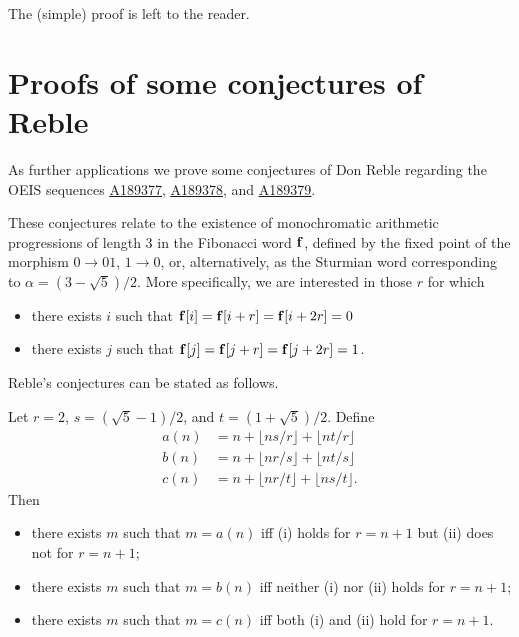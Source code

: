 \documentclass[12pt,reqno]{article}
\newcommand{\seqnum}[1]{\href{https://oeis.org/#1}{\rm \underline{#1}}}
\begin{document}
The (simple) proof  is left to the reader.

\section{Proofs of some conjectures of Reble}
\label{reble}

As further applications we prove some conjectures of Don Reble regarding
the OEIS sequences \seqnum{A189377}, 
\seqnum{A189378}, and \seqnum{A189379}.

These conjectures relate to the existence
of monochromatic arithmetic progressions
of length $3$ in the Fibonacci word $\bf f$, defined by
the fixed point of the morphism $0 \rightarrow 01$, $1 \rightarrow 0$, or, alternatively, as the Sturmian word
corresponding to $\alpha = (3-\sqrt{5})/2$.
More specifically, we are interested in those $r$ for which
\begin{itemize}
\item[(i)] there exists $i$ such that
${\bf f}[i] = {\bf f}[i+r] = {\bf f}[i+2r] = 0$
\item[(ii)] there exists $j$ such that
${\bf f}[j] = {\bf f}[j+r] = {\bf f}[j+2r] = 1$.
\end{itemize}

Reble's conjectures can be stated as follows.
\begin{theorem}
Let $r = 2$, $s = (\sqrt{5}-1)/2$, and $t = (1+\sqrt{5})/2$.
Define
\begin{align*}
a(n) &= n + \lfloor ns/r \rfloor + \lfloor nt/r \rfloor \\
b(n) &= n + \lfloor nr/s \rfloor + \lfloor nt/s \rfloor \\
c(n) &= n + \lfloor nr/t \rfloor + \lfloor ns/t \rfloor .
\end{align*}
Then 
\begin{itemize}
\item[(a)]
there exists $m$ such that $m = a(n)$ iff (i) holds
for $r= n+1$ but (ii) does not for $r = n+1$;
\item[(b)]
there exists $m$ such that $m = b(n)$ iff neither
(i) nor (ii) holds for $r = n+1$;
\item[(c)]
there exists $m$ such that $m = c(n)$ iff both
(i) and (ii) hold for $r = n+1$.
\end{itemize}
\end{theorem}
\end{document}
